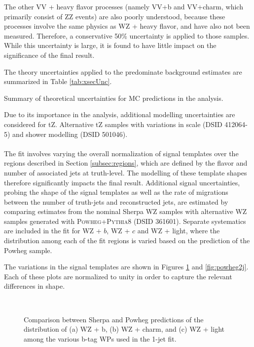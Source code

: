 The other VV + heavy flavor processes (namely VV+b and VV+charm, which primarily consist of ZZ events) are also poorly understood, because these processes involve the same physics as WZ + heavy flavor, and have also not been measured. Therefore, a conservative 50\% uncertainty is applied to those samples. While this uncertainty is large, it is found to have little impact on the significance of the final result.

The theory uncertainties applied to the predominate background estimates are summarized in Table \ref{tab:xsecUnc}. 

\begin{table}[H]
{\footnotesize
\centering

\caption{Summary of theoretical uncertainties for MC predictions in the analysis.}
\label{tab:xsecUnc}
}
\end{table}

Due to its importance in the analysis, additional modelling uncertainties are considered for tZ. Alternative tZ samples with variations in scale (DSID 412064-5) and shower modelling (DSID 501046).

\paragraph{}
The fit involves varying the overall normalization of signal templates over the regions described in Section \ref{subsec:regions}, which are defined by the flavor and number of associated jets at truth-level. The modelling of these template shapes therefore significantly impacts the final result. Additional signal uncertainties, probing the shape of the signal templates as well as the rate of migrations between the number of truth-jets and reconstructed jets, are estimated by comparing estimates from the nominal Sherpa WZ samples with alternative WZ samples generated with \textsc{Powheg}+\textsc{Pythia8} (DSID 361601). Separate systematics are included in the fit for WZ + $b$, WZ + $c$ and WZ + light, where the distribution among each of the fit regions is varied based on the prediction of the Powheg sample.

The variations in the signal templates are shown in Figures \ref{fig:powheg1j} and \ref{fig:powheg2j}. Each of these plots are normalized to unity in order to capture the relevant differences in shape. 

\begin{figure}[H]
    \centering
    \\
    \caption{Comparison between Sherpa and Powheg predictions of the distribution of (a) WZ + b, (b) WZ + charm, and (c) WZ + light among the various b-tag WPs used in the 1-jet fit.}
\label{fig:powheg1j}
\end{figure}

